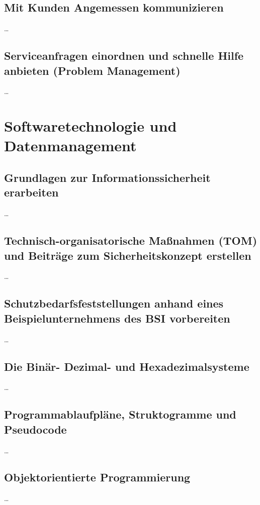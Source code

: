 \documentclass[a4paper, 12pt]{report}
\begin{document}
\section{Mit Kunden Angemessen kommunizieren}
\dots

\section{Serviceanfragen einordnen und schnelle Hilfe anbieten (Problem Management)}
\dots


\chapter{Softwaretechnologie und Datenmanagement}

\section{Grundlagen zur Informationssicherheit erarbeiten}
\dots

\section{Technisch-organisatorische Maßnahmen (TOM) und Beiträge zum Sicherheitskonzept erstellen}
\dots

\section{Schutzbedarfsfeststellungen anhand eines Beispielunternehmens des BSI vorbereiten}
\dots

\section{Die Binär- Dezimal- und Hexadezimalsysteme}
\dots

\section{Programmablaufpläne, Struktogramme und Pseudocode}
\dots

\section{Objektorientierte Programmierung}
\dots
\end{document}
